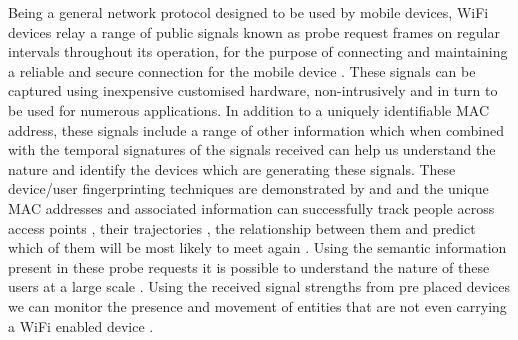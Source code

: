 Being a general network protocol designed to be used by mobile devices, WiFi devices relay a range of public signals known as probe request frames on regular intervals throughout its operation, for the purpose of connecting and maintaining a reliable and secure connection for the mobile device \citep{freudiger2015}.
These signals can be captured using inexpensive customised hardware, non-intrusively and in turn to be used for numerous applications.
In addition to a uniquely identifiable MAC address, these signals include a range of other information which when combined with the temporal signatures of the signals received can help us understand the nature and identify the devices which are generating these signals.
These device/user fingerprinting techniques are demonstrated by \citep{franklin2006} and \citep{pang2007} and the unique MAC addresses and associated information can successfully track people across access points \citep{cunche2014a}, their trajectories \citep{musa2012}, the relationship between them \citep{cheng2012, barbera2013, cunche2014b} and predict which of them will be most likely to meet again \citep{cunche2012}.
Using the semantic information present in these probe requests it is possible to understand the nature of these users at a large scale \citep{di luzio2016}.
Using the received signal strengths from pre placed devices we can monitor the presence and movement of entities that are not even carrying a WiFi enabled device \citep{elgohary2013}.

